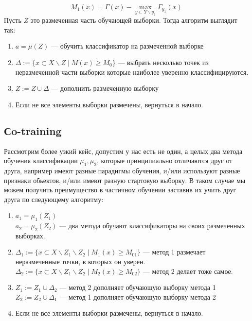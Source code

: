 \begin{equation*}
    M_1(x) = \Gamma(x) - \max_{y \subset Y\backslash y_1}\Gamma_{y_1}(x) 
\end{equation*}
Пусть $Z$ это размеченная часть обучающей выборки. Тогда алгоритм выглядит так:
\begin{enumerate}
  \item $a = \mu(Z)$ --- обучить классификатор на размеченной выборке
  \item $\Delta := \{x \subset X\backslash Z \;|\; M(x) \geq M_0 \}$ --- выбрать несколько точек из неразмеченной части выборки которые наиболее уверенно классифицируются. 
  \item $Z := Z\cup\Delta$ --- дополнить размеченную выборку
  \item Если не все элементы выборки размечены, вернуться в начало.
\end{enumerate}
\subsection{Сo-training}
Рассмотрим более узкий кейс, допустим у нас есть не один, а целых два метода обучения классификации $\mu_1, \mu_2$, которые принципиально отличаются друг от друга, например имеют разные парадигмы обучения, и/или используют разные признаки обьектов, и/или имеют разную стартовую выборку. В таком случае мы можем получить преимущество в частичном обучении заставив их учить друг друга по следующему алгоритму:
\begin{enumerate}
  \item $a_1 = \mu_1(Z_1)$\\
  $a_2 = \mu_2(Z_2)$ --- два метода обучают классификаторы на своих размеченных выборках. 
  \item $\Delta_1 := \{x \subset X\backslash Z_1\backslash Z_2 \;|\; M_1(x) \geq M_{01} \}$ --- метод 1 размечает неразмеченные точки, в которых он уверен.\\
  $\Delta_2 := \{x \subset X\backslash Z_1\backslash Z_2 \;|\; M_2(x) \geq M_{02} \}$ --- метод 2 делает тоже самое.
  \item $Z_1 := Z_1\cup\Delta_2$ --- метод 2 дополняет обучающую выборку метода 1 \\
  $Z_2 := Z_2\cup\Delta_1$ --- метод 1 дополняет обучающую выборку метода 2
  \item Если не все элементы выборки размечены, вернуться в начало.
\end{enumerate}
